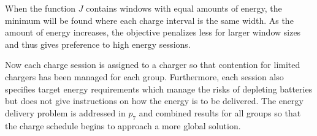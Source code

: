 When the function $J$ contains windows with equal amounts of energy, the minimum will be found where each charge interval is the same width. As the amount of energy increases, the objective penalizes less for larger window sizes and thus gives preference to high energy sessions.
\par Now each charge session is assigned to a charger so that contention for limited chargers has been managed for each group. Furthermore, each session also specifies target energy requirements which manage the risks of depleting batteries but does not give instructions on how the energy is to be delivered. The energy delivery problem is addressed in $p_7$ and combined results for all groups so that the charge schedule begins to approach a more global solution.  
\\[0.1in]  


